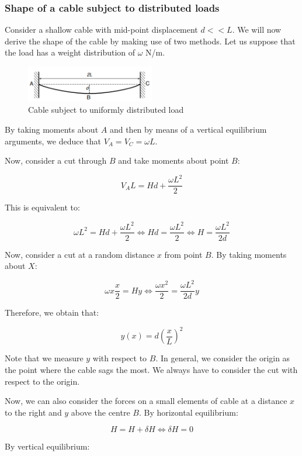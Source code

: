 \documentclass{article}
\begin{document}
\subsubsection{Shape of a cable subject to distributed loads}

Consider a shallow cable with mid-point displacement $d << L$. We will now derive the shape of the cable by making use of two methods. Let us suppose that the load has a weight distribution of $\omega$ N/m.

\begin{figure}[h]
    \centering
    \includegraphics[width = 0.5\textwidth]{images/cable2.png}
    \caption{Cable subject to uniformly distributed load}
    \label{fig:enter-label}
\end{figure}

By taking moments about $A$ and then by means of a vertical equilibrium arguments, we deduce that $V_A = V_C = \omega L$.

Now, consider a cut through $B$ and take moments about point $B$:

\[ V_AL = Hd + \frac{\omega L^2}{2} \]

This is equivalent to:

\[ \omega L^2 = Hd + \frac{\omega L^2}{2} \iff Hd = \frac{\omega L^2}{2} \iff H = \frac{\omega L^2}{2d} \]

Now, consider a cut at a random distance $x$ from point $B$. By taking moments about $X$:

\[ \omega x \frac{x}{2}  = Hy \iff \frac{\omega x^2}{2} = \frac{\omega L^2}{2d}y \]

Therefore, we obtain that:

\[ y(x) = d\left(\frac{x}{L}\right)^2 \]

Note that we measure $y$ with respect to $B$. In general, we consider the origin as the point where the cable sags the most. We always have to consider the cut with respect to the origin.

Now, we can also consider the forces on a small elements of cable at a distance $x$ to the right and $y$ above the centre $B$. By horizontal equilibrium:

\[ H = H + \delta H \iff \delta H = 0 \]

By vertical equilibrium:
\end{document}
